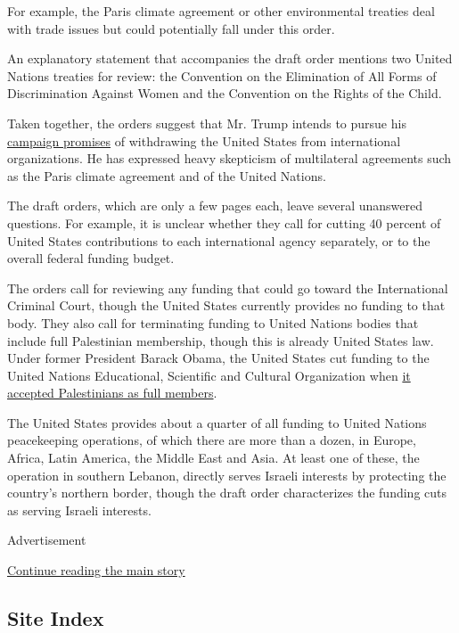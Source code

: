 For example, the Paris climate agreement or other environmental treaties
deal with trade issues but could potentially fall under this order.

An explanatory statement that accompanies the draft order mentions two
United Nations treaties for review: the Convention on the Elimination of
All Forms of Discrimination Against Women and the Convention on the
Rights of the Child.

Taken together, the orders suggest that Mr. Trump intends to pursue his
\href{https://www.nytimes.com/2017/01/20/us/politics/trump-resurrects-dark-definition-of-america-first-vision.html}{campaign
promises} of withdrawing the United States from international
organizations. He has expressed heavy skepticism of multilateral
agreements such as the Paris climate agreement and of the United
Nations.

The draft orders, which are only a few pages each, leave several
unanswered questions. For example, it is unclear whether they call for
cutting 40 percent of United States contributions to each international
agency separately, or to the overall federal funding budget.

The orders call for reviewing any funding that could go toward the
International Criminal Court, though the United States currently
provides no funding to that body. They also call for terminating funding
to United Nations bodies that include full Palestinian membership,
though this is already United States law. Under former President Barack
Obama, the United States cut funding to the United Nations Educational,
Scientific and Cultural Organization when
\href{http://www.nytimes.com/2011/11/01/world/middleeast/unesco-approves-full-membership-for-palestinians.html}{it
accepted Palestinians as full members}.

The United States provides about a quarter of all funding to United
Nations peacekeeping operations, of which there are more than a dozen,
in Europe, Africa, Latin America, the Middle East and Asia. At least one
of these, the operation in southern Lebanon, directly serves Israeli
interests by protecting the country's northern border, though the draft
order characterizes the funding cuts as serving Israeli interests.

Advertisement

\protect\hyperlink{after-bottom}{Continue reading the main story}

\hypertarget{site-index}{%
\subsection{Site Index}\label{site-index}}

